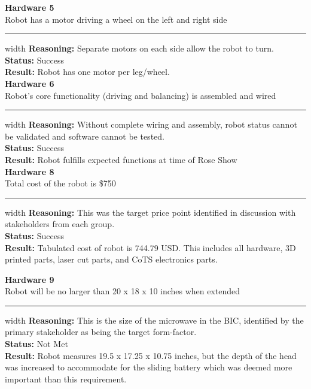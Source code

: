 \documentclass{fank1basedocument}
\begin{document}
{\large \textbf{Hardware 5}}\\
Robot has a motor driving a wheel on the left and right side
\hrule width \linewidth
\vspace{2px}
\textbf{Reasoning:} Separate motors on each side allow the robot to turn.\\
\textbf{Status:} \color{ForestGreen}Success\color{black}\\
\textbf{Result:} Robot has one motor per leg/wheel.\\

{\large \textbf{Hardware 6}}\\
Robot’s core functionality (driving and balancing) is assembled and wired
\hrule width \linewidth
\vspace{2px}
\textbf{Reasoning:} Without complete wiring and assembly, robot status cannot be validated and software cannot be tested.\\
\textbf{Status:} \color{ForestGreen}Success\color{black}\\
\textbf{Result:} Robot fulfills expected functions at time of Rose Show\\

{\large \textbf{Hardware 8}}\\
Total cost of the robot is \$750
\hrule width \linewidth
\vspace{2px}
\textbf{Reasoning:} This was the target price point identified in discussion with stakeholders from each group.\\
\textbf{Status:} \color{ForestGreen}Success\color{black}\\
\textbf{Result:} Tabulated cost of robot is 744.79 USD. This includes all hardware, 3D printed parts, laser cut parts, and CoTS electronics parts.\\

\pagebreak

{\large \textbf{Hardware 9}}\\
Robot will be no larger than 20 x 18 x 10 inches when extended
\hrule width \linewidth
\vspace{2px}
\textbf{Reasoning:} This is the size of the microwave in the BIC, identified by the primary stakeholder as being the target form-factor.\\
\textbf{Status:} \color{BrickRed}Not Met\color{black}\\
\textbf{Result:} Robot measures 19.5 x 17.25 x 10.75 inches, but the depth of the head was increased to accommodate for the sliding battery which was deemed more important than this requirement.\\
\end{document}

